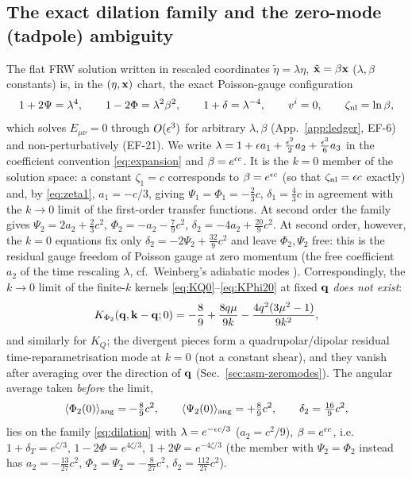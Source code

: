 \subsection{The exact dilation family and the zero-mode (tadpole) ambiguity}
\label{sec:tadpole}
The flat FRW solution written in rescaled coordinates $\tilde\eta=\lambda\eta$, $\tilde{\mathbf x}=\beta\mathbf x$ ($\lambda,\beta$ constants) is,
in the $(\eta,\mathbf x)$ chart, the exact Poisson-gauge configuration
\begin{equation}
1+2\Psi=\lambda^4,\qquad 1-2\Phi=\lambda^2\beta^2,\qquad 1+\delta=\lambda^{-4},\qquad v^i=0,\qquad \zeta_{\rm nl}=\ln\beta ,
\label{eq:dilation}
\end{equation}
which solves $E_{\mu\nu}=0$ through $O(\epsilon^3)$ for arbitrary $\lambda,\beta$ (App.~\ref{app:ledger}, EF-6) and non-perturbatively (EF-21).
We write $\lambda=1+\epsilon a_1+\tfrac{\epsilon^2}2a_2+\tfrac{\epsilon^3}6a_3$ in the coefficient convention \eqref{eq:expansion} and
$\beta=e^{\epsilon c}$.  It is the $k=0$ member of the solution space: a constant $\zeta_1=c$ corresponds to $\beta=e^{\epsilon c}$ (so that
$\zeta_{\rm nl}=\epsilon c$ exactly) and, by \eqref{eq:zeta1}, $a_1=-c/3$, giving $\Psi_1=\Phi_1=-\tfrac23c$, $\delta_1=\tfrac43c$ in agreement with
the $k\to0$ limit of the first-order transfer functions.  At second order the family gives
$\Psi_2=2a_2+\tfrac23c^2$, $\Phi_2=-a_2-\tfrac79c^2$, $\delta_2=-4a_2+\tfrac{20}9c^2$.  At second order, however, the $k=0$ equations fix only
$\delta_2=-2\Psi_2+\tfrac{32}9c^2$ and leave $\Phi_2,\Psi_2$ free: this is the residual gauge freedom of
Poisson gauge at zero momentum (the free coefficient $a_2$ of the time rescaling $\lambda$, cf.\ Weinberg's adiabatic modes
\cite{Weinberg03,MZ}).  Correspondingly, the $k\to0$ limit of the finite-$k$ kernels \eqref{eq:KQ0}--\eqref{eq:KPhi20} at fixed $\mathbf q$
\emph{does not exist}:
\begin{equation}
K_{\Phi_2}(\mathbf q,\mathbf k-\mathbf q;0)=-\frac89+\frac{8q\mu}{9k}-\frac{4q^2(3\mu^2-1)}{9k^2},
\label{eq:KPhi20_smallk}
\end{equation}
and similarly for $K_Q$; the divergent pieces form a quadrupolar/dipolar residual time-reparametrisation mode at $k=0$ (not a constant
shear), and they vanish after averaging over the direction of $\mathbf q$ (Sec.~\ref{sec:asm-zeromodes}).  The angular average taken \emph{before} the
limit,
\begin{equation}
\langle\Phi_2(0)\rangle_{\rm ang}=-\tfrac89c^2,\qquad \langle\Psi_2(0)\rangle_{\rm ang}=+\tfrac89c^2,\qquad
\delta_2=\tfrac{16}9c^2,
\label{eq:tad0}
\end{equation}
lies on the family \eqref{eq:dilation} with $\lambda=e^{-\epsilon c/3}$ ($a_2=c^2/9$), $\beta=e^{\epsilon c}$, i.e.\ $1+\delta_T=e^{\zeta/3}$,
$1-2\Phi=e^{4\zeta/3}$, $1+2\Psi=e^{-4\zeta/3}$ (the member with $\Psi_2=\Phi_2$ instead has $a_2=-\tfrac{13}{27}c^2$,
$\Phi_2=\Psi_2=-\tfrac8{27}c^2$, $\delta_2=\tfrac{112}{27}c^2$).

